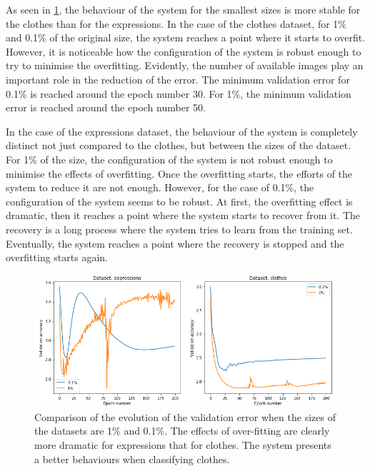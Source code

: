 \documentclass{article}
\begin{document}
As seen in \ref{fig:tf_beh}, the behaviour of the system for the smallest sizes is more stable for the clothes than for the expressions. In the case of the clothes dataset, for 1\% and 0.1\% of the original size, the system reaches a point where it starts to overfit. However, it is noticeable how the configuration of the system is robust enough to try to minimise the overfitting. Evidently, the number of available images play an important role in the reduction of the error. The minimum validation error for 0.1\% is reached around the epoch number 30. For 1\%, the minimum validation error is reached around the epoch number 50.

In the case of the expressions dataset, the behaviour of the system is completely distinct not just compared to the clothes, but between the sizes of the dataset. For 1\% of the size, the configuration of the system is not robust enough to minimise the effects of overfitting. Once the overfitting starts, the efforts of the system to reduce it are not enough. However, for the case of 0.1\%, the configuration of the system seems to be robust.  At first, the overfitting effect is dramatic, then it reaches a point where the system starts to recover from it. The recovery is a long process where the system tries to learn from the training set. Eventually, the system reaches a point where the recovery is stopped and the overfitting starts again.

\begin{figure}[tb]
    \vskip 5mm
        \begin{center}
            \includegraphics[scale=0.4]{behaviour_rotated.png}
            \caption{Comparison of the evolution of the validation error when the sizes of the datasets are 1\% and 0.1\%. The effects of over-fitting are clearly more dramatic for expressions that for clothes. The system presents a better behaviours when classifying clothes. }
            \label{fig:tf_beh}
        \end{center}
    \vskip -5mm
\end{figure}
\end{document}
